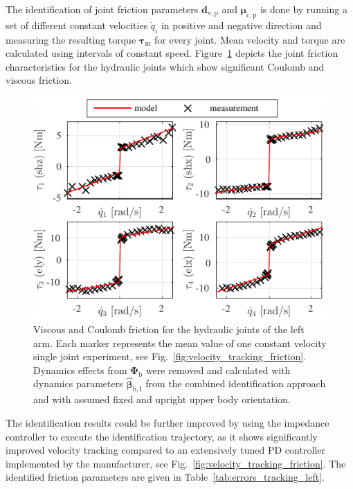 The identification of joint friction parameters $\bm{d}_{\mathrm{v,p}}$ and $\bm{\mu}_{\mathrm{c,p}}$ is done by running a set of different constant velocities $\dot{q}_i$ in positive and negative direction and measuring the resulting torque $\bm{\tau}_{\mathrm{m}}$ for every joint. 
Mean velocity and torque are calculated using intervals of constant speed.
Figure~\ref{fig:ident_friction_char} depicts the joint friction characteristics for the hydraulic joints which show significant Coulomb and viscous friction. 

\begin{figure}
\centering
\includegraphics[]{./figures/Identification/FrictionCharacteristics_left}
\caption{Viscous and Coulomb friction for the hydraulic joints of the left arm. Each marker represents the mean value of one constant velocity single joint experiment, see Fig.~\ref{fig:velocity_tracking_friction}. Dynamics effects from $\bm{\Phi}_{\mathrm{b}}$ were removed and calculated with dynamics parameters $\hat{\bm{\beta}}_{\mathrm{b,I}}$ from the combined identification approach \cite{SpVdTh14} and with assumed fixed and upright upper body orientation.}
\label{fig:ident_friction_char}
\SkipBeforePicture
\end{figure}

The identification results could be further improved by using the impedance controller to execute the identification trajectory, as it shows significantly improved velocity tracking compared to an extensively tuned PD controller implemented by the manufacturer, see Fig.~\ref{fig:velocity_tracking_friction}.
The identified friction parameters are given in Table~\ref{tab:errors_tracking_left}.


